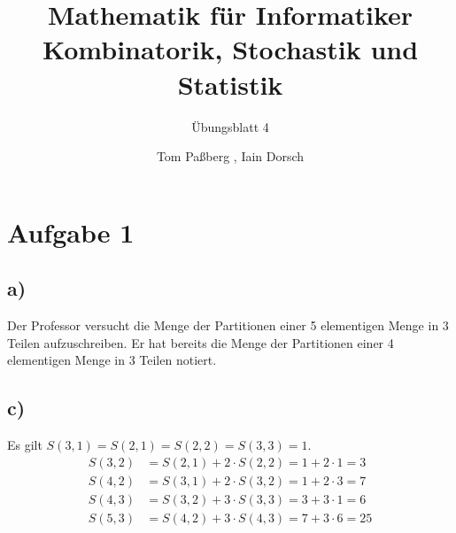 \documentclass[a4paper]{scrartcl}
\title{Mathematik für Informatiker \\ Kombinatorik, Stochastik und Statistik}
\subtitle{Übungsblatt 4}
\author{Tom Paßberg , Iain Dorsch}
\date{}
\begin{document}
\maketitle

\newpage

\section*{Aufgabe 1}
\subsection*{a)}
Der Professor versucht die Menge der Partitionen einer 5 elementigen Menge in 3 Teilen aufzuschreiben.
Er hat bereits die Menge der Partitionen einer 4 elementigen Menge in 3 Teilen notiert.

\subsection*{c)}
Es gilt $ S(3,1) = S(2,1) = S(2,2) = S(3,3) = 1$.
\begin{align*}
    S(3,2) &= S(2,1) + 2 \cdot S(2,2) = 1 + 2 \cdot 1 = 3 \\
    S(4,2) &= S(3,1) + 2 \cdot S(3,2) = 1 + 2 \cdot 3 = 7 \\
    S(4,3) &= S(3,2) + 3 \cdot S(3,3) = 3 + 3 \cdot 1 = 6 \\
    S(5,3) &= S(4,2) + 3 \cdot S(4,3) = 7 + 3 \cdot 6 = 25 \\
\end{align*}
\end{document}
